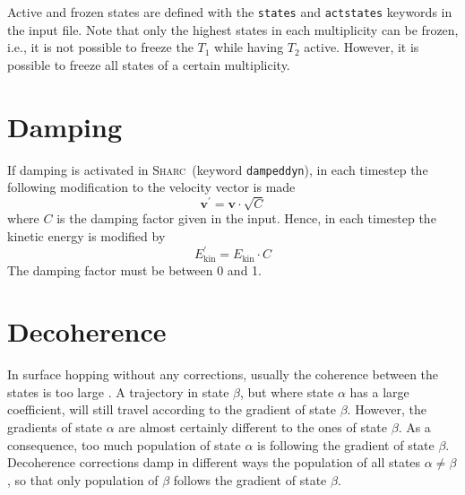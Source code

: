 \documentclass[a4paper,11pt,DIV=15,openany,twoside=false]{scrbook}
\newcommand{\sharc}{\textsc{Sharc}}
\newcommand{\ttt}[1]{\texttt{#1}}
\renewcommand{\vec}[1]{\ensuremath{\mathbf{#1}}}
\begin{document}
Active and frozen states are defined with the \ttt{states} and \ttt{actstates} keywords in the input file. Note that only the highest states in each multiplicity can be frozen, i.e., it is not possible to freeze the $T_1$ while having $T_2$ active. However, it is possible to freeze all states of a certain multiplicity.


\section{Damping}

If damping is activated in \sharc\ (keyword \ttt{dampeddyn}), in each timestep the following modification to the velocity vector is made
\begin{equation}
  \vec{v}^\prime=\vec{v}\cdot\sqrt{C}
\end{equation}
where $C$ is the damping factor given in the input. Hence, in each timestep the kinetic energy is modified by
\begin{equation}
  E_{\text{kin}}^\prime=E_{\text{kin}}\cdot C
\end{equation}
The damping factor must be between 0 and 1.


\section{Decoherence}\label{met:decoherence}

In surface hopping without any corrections, usually the coherence between the states is too large \cite{Granucci2007JCP}. A trajectory in state $\beta$, but where state $\alpha$ has a large coefficient, will still travel according to the gradient of state $\beta$. However, the gradients of state $\alpha$ are almost certainly different to the ones of state $\beta$. As a consequence, too much population of state $\alpha$ is following the gradient of state $\beta$. Decoherence corrections damp in different ways the population of all states $\alpha\neq\beta$, so that only population of $\beta$ follows the gradient of state $\beta$.
\end{document}
